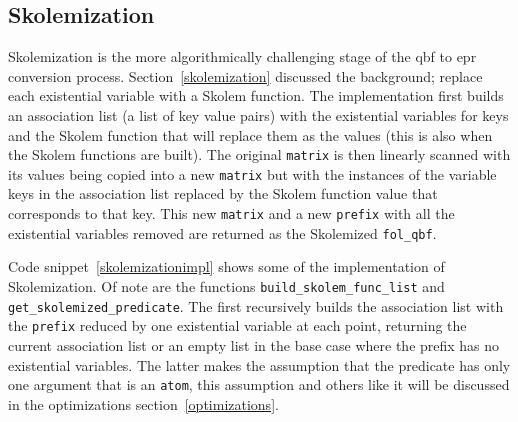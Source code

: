 \subsection{Skolemization}
Skolemization is the more algorithmically challenging stage of the \gls{qbf} to \gls{epr} conversion process. Section~\ref{skolemization} discussed the background; replace each existential variable with a Skolem function. The implementation first builds an association list (a list of key value pairs) with the existential variables for keys and the Skolem function that will replace them as the values (this is also when the Skolem functions are built). The original \texttt{matrix} is then linearly scanned with its values being copied into a new \texttt{matrix} but with the instances of the variable keys in the association list replaced by the Skolem function value that corresponds to that key. This new \texttt{matrix} and a new \texttt{prefix} with all the existential variables removed are returned as the Skolemized \texttt{fol\_qbf}.

Code snippet~\ref{skolemizationimpl} shows some of the implementation of Skolemization. Of note are the functions \texttt{build\_skolem\_func\_list} and \texttt{get\_skolemized\_predicate}. The first recursively builds the association list with the \texttt{prefix} reduced by one existential variable at each point, returning the current association list or an empty list in the base case where the prefix has no existential variables. The latter makes the assumption that the predicate has only one argument that is an \texttt{atom}, this assumption and others like it will be discussed in the optimizations section~\ref{optimizations}.

